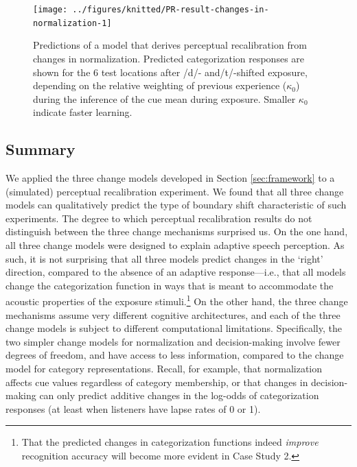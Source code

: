\documentclass[
  11pt,
  english,
  man,floatsintext]{apa6}
\begin{document}
\begin{figure}

{\centering \texttt{[image: ../figures/knitted/PR-result-changes-in-normalization-1]} 

}

\caption{Predictions of a model that derives perceptual recalibration from changes in normalization. Predicted categorization responses are shown for the 6 test locations after /d/- and/t/-shifted exposure, depending on the relative weighting of previous experience (\(\kappa_0\)) during the inference of the cue mean during exposure. Smaller \(\kappa_0\) indicate faster learning.}\label{fig:PR-result-changes-in-normalization}
\end{figure}

\hypertarget{summary}{%
\subsection{Summary}\label{summary}}

We applied the three change models developed in Section \ref{sec:framework} to a (simulated) perceptual recalibration experiment. We found that all three change models can qualitatively predict the type of boundary shift characteristic of such experiments. The degree to which perceptual recalibration results do not distinguish between the three change mechanisms surprised us. On the one hand, all three change models were designed to explain adaptive speech perception. As such, it is not surprising that all three models predict changes in the `right' direction, compared to the absence of an adaptive response---i.e., that all models change the categorization function in ways that is meant to accommodate the acoustic properties of the exposure stimuli.\footnote{That the predicted changes in categorization functions indeed \emph{improve} recognition accuracy will become more evident in Case Study 2.} On the other hand, the three change mechanisms assume very different cognitive architectures, and each of the three change models is subject to different computational limitations. Specifically, the two simpler change models for normalization and decision-making involve fewer degrees of freedom, and have access to less information, compared to the change model for category representations. Recall, for example, that normalization affects cue values regardless of category membership, or that changes in decision-making can only predict additive changes in the log-odds of categorization responses (at least when listeners have lapse rates of 0 or 1).
\end{document}
